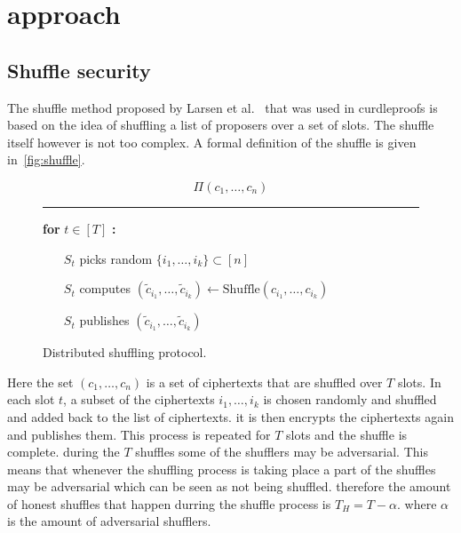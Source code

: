 \section{approach}\label{sec:approach}


\subsection{Shuffle security}\label{sec:approach-shuffle-security}
The shuffle method proposed by Larsen et al.~\cite{cryptoeprint:2022/560} that was used in curdleproofs is based on the idea of shuffling a list of proposers over a set of slots.
The shuffle itself however is not too complex.
A formal definition of the shuffle is given in~\autoref{fig:shuffle}.

\begin{figure}[ht]\label{fig:shuffle}

    \begin{framed}
        \[
            \Pi(c_1, \ldots, c_n)
        \]
        \rule{\linewidth}{0.4pt}

        \noindent
        \textbf{for} $t \in [T]$ \textbf{:}
        \begin{itemize}
            \item[$S_t$] picks random $\{i_1, \ldots, i_k\} \subset [n]$
            \item[$S_t$] computes $(\tilde{c}_{i_1}, \ldots, \tilde{c}_{i_k}) \leftarrow \text{Shuffle}(c_{i_1}, \ldots, c_{i_k})$
            \item[$S_t$] publishes $(\tilde{c}_{i_1}, \ldots, \tilde{c}_{i_k})$
        \end{itemize}
    \end{framed}
    \caption{Distributed shuffling protocol.}
\end{figure}

Here the set $(c_1, \ldots, c_n)$ is a set of ciphertexts that are shuffled over $T$ slots.
In each slot $t$, a subset of the ciphertexts ${i_1, \ldots, i_k}$ is chosen randomly and shuffled and added back to the list of ciphertexts.
it is then encrypts the ciphertexts again and publishes them.
This process is repeated for $T$ slots and the shuffle is complete.
during the $T$ shuffles some of the shufflers may be adversarial.
This means that whenever the shuffling process is taking place a part of the shuffles may be adversarial which can be seen as not being shuffled.
therefore the amount of honest shuffles that happen durring the shuffle process is $T_H = T - \alpha$.
where $\alpha$ is the amount of adversarial shufflers.


